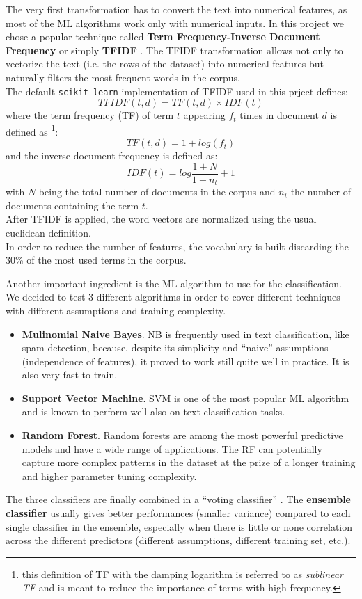 \documentclass[a4paper,12pt]{article} %
\begin{document}
The very first transformation has to convert the text into numerical features,
as most of the ML algorithms work only with numerical inputs.
In this project we chose a popular technique called \textbf{Term Frequency-Inverse Document Frequency}
or simply \textbf{TFIDF} \cite{TFIDF}.
The TFIDF transformation allows not only to vectorize the text (i.e. the rows of the dataset)
into numerical features but naturally filters the most frequent words in the corpus.\\
The default \texttt{scikit-learn} implementation of TFIDF used in this prject defines:
\begin{equation}
TFIDF (t, d) = TF(t, d) \times IDF (t)
\end{equation}
where the term frequency (TF) of term $t$ appearing $f_{t}$ times in document $d$ is defined as
\footnote{this definition of TF with the damping logarithm is referred to as \textit{sublinear TF} and
is meant to reduce the importance of terms with high frequency.}:
\begin{equation}
TF (t, d) = 1 + log(f_{t})
\end{equation}
and the inverse document frequency is defined as:
\begin{equation}
IDF (t) = log \frac{1+N}{1+n_{t}} + 1
\end{equation}
with $N$ being the total number of documents in the corpus and $n_{t}$ the number
of documents containing the term $t$.\\
After TFIDF is applied, the word vectors are normalized using the usual euclidean definition. \\
In order to reduce the number of features, the vocabulary is built discarding the
30\% of the most used terms in the corpus.

Another important ingredient is the ML algorithm to use for the classification.
We decided to test 3 different algorithms in order to cover different techniques with different assumptions
and training complexity.
\begin{itemize}
\item \textbf{Mulinomial Naive Bayes}. NB is frequently used in text classification,
like spam detection, because, despite its simplicity and ``naive'' assumptions (independence of features),
it proved to work still quite well in practice. It is also very fast to train.
\item \textbf{Support Vector Machine}. SVM is one of the most popular ML algorithm and
is known to perform well also on text classification tasks.
\item \textbf{Random Forest}. Random forests are among the most powerful predictive
models and have a wide range of applications. The RF can potentially capture
more complex patterns in the dataset at the prize of a longer training and higher
parameter tuning complexity.
\end{itemize}
The three classifiers are finally combined in a ``voting classifier'' \cite{scikit-ensemble}.
The \textbf{ensemble classifier} usually gives better performances (smaller variance) compared to each single classifier in the
ensemble, especially when there is little or none correlation across the different predictors
(different assumptions, different training set, etc.).
\end{document}
